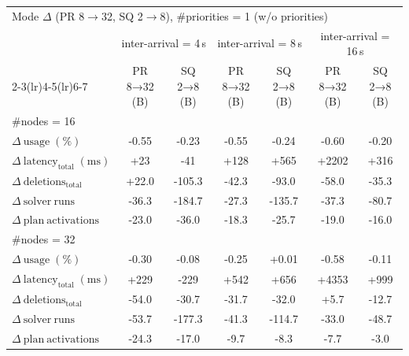 
\begin{tabular}{l c c c c c c}
\toprule
\multicolumn{7}{l}{Mode $\Delta$ (PR 8$\rightarrow$32, SQ 2$\rightarrow$8), \#priorities = 1 (w/o priorities)} \\
\addlinespace[0.2em]
 & \multicolumn{2}{c}{inter-arrival = 4\,s} & \multicolumn{2}{c}{inter-arrival = 8\,s} & \multicolumn{2}{c}{inter-arrival = 16\,s} \\
\cmidrule(lr){2-3}\cmidrule(lr){4-5}\cmidrule(lr){6-7}
 & PR 8→32 (B) & SQ 2→8 (B) & PR 8→32 (B) & SQ 2→8 (B) & PR 8→32 (B) & SQ 2→8 (B) \\
\midrule
\multicolumn{7}{l}{\#nodes = 16} \\
\midrule
$\Delta\ \mathrm{usage}\;(\%)$ & -0.55 & -0.23 & -0.55 & -0.24 & -0.60 & -0.20 \\
$\Delta\ \mathrm{latency}_{\mathrm{total}}\;(\mathrm{ms})$ & +23 & -41 & +128 & +565 & +2202 & +316 \\
$\Delta\ \mathrm{deletions}_{\mathrm{total}}$ & +22.0 & -105.3 & -42.3 & -93.0 & -58.0 & -35.3 \\
$\Delta\ \mathrm{solver\ runs}$ & -36.3 & -184.7 & -27.3 & -135.7 & -37.3 & -80.7 \\
$\Delta\ \mathrm{plan\ activations}$ & -23.0 & -36.0 & -18.3 & -25.7 & -19.0 & -16.0 \\
\midrule
\multicolumn{7}{l}{\#nodes = 32} \\
\midrule
$\Delta\ \mathrm{usage}\;(\%)$ & -0.30 & -0.08 & -0.25 & +0.01 & -0.58 & -0.11 \\
$\Delta\ \mathrm{latency}_{\mathrm{total}}\;(\mathrm{ms})$ & +229 & -229 & +542 & +656 & +4353 & +999 \\
$\Delta\ \mathrm{deletions}_{\mathrm{total}}$ & -54.0 & -30.7 & -31.7 & -32.0 & +5.7 & -12.7 \\
$\Delta\ \mathrm{solver\ runs}$ & -53.7 & -177.3 & -41.3 & -114.7 & -33.0 & -48.7 \\
$\Delta\ \mathrm{plan\ activations}$ & -24.3 & -17.0 & -9.7 & -8.3 & -7.7 & -3.0 \\
\bottomrule
\end{tabular}

